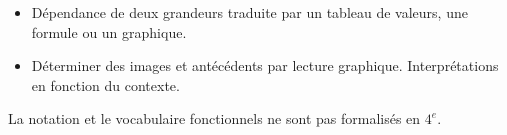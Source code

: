 \begin{prerequis}[Prérequis]    
    \begin{itemize}
    \item Dépendance de deux grandeurs traduite par un tableau de valeurs, une formule ou un graphique.    
    \columnbreak    
    \item Déterminer des images et antécédents par lecture graphique. Interprétations en fonction du contexte.
    \end{itemize}
\end{prerequis}
\begin{remarque}
    La notation et le vocabulaire fonctionnels ne sont pas formalisés en $4^e$.
\end{remarque}    
